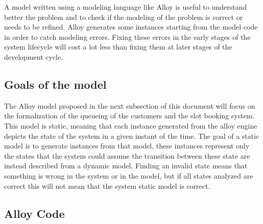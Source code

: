 A model written using a modeling language like Alloy is useful to understand better the problem and to check if the modeling of the problem is correct or needs to be refined. Alloy generates some instances starting from the model code in order to catch modeling errors. Fixing these errors in the early stages of the system lifecycle will cost a lot less than fixing them at later stages of the development cycle.

\subsection{Goals of the model}
The Alloy model proposed in the next subsection of this document will focus on the formalization of the queueing of the customers and the slot booking system. This model is static, meaning that each instance generated from the alloy engine depicts the state of the system in a given instant of the time. The goal of a static model is to generate instances from that model, these instances represent only the states that the system could assume the transition between these state are instead described from a dynamic model. Finding an invalid state means that something is wrong in the system or in the model, but if all states analyzed are correct this will not mean that the system static model is correct.
\subsection{Alloy Code}


\clearpage

